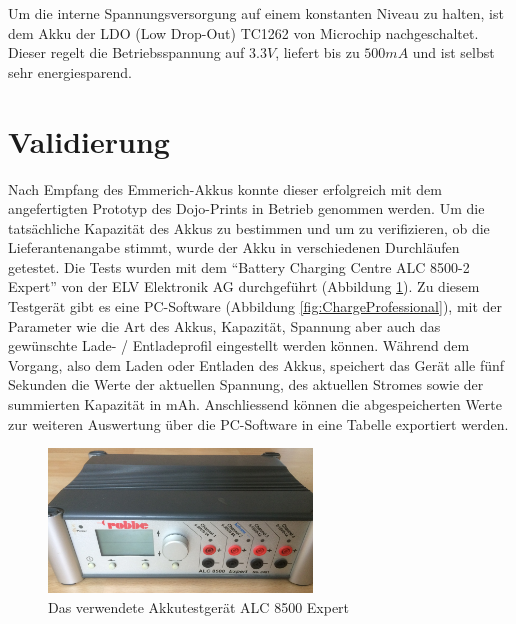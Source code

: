 
Um die interne Spannungsversorgung auf einem konstanten Niveau zu halten, ist dem Akku der LDO (Low Drop-Out) TC1262 von Microchip nachgeschaltet. Dieser regelt die Betriebsspannung auf $3.3V$, liefert bis zu $500mA$ und ist selbst sehr energiesparend.


\section{Validierung}

Nach Empfang des Emmerich-Akkus konnte dieser erfolgreich mit dem angefertigten Prototyp des Dojo-Prints in Betrieb genommen werden. Um die tatsächliche Kapazität des Akkus zu bestimmen und um zu verifizieren, ob die Lieferantenangabe stimmt, wurde der Akku in verschiedenen Durchläufen getestet. Die Tests wurden mit dem ``Battery Charging Centre ALC 8500-2 Expert'' von der ELV Elektronik AG durchgeführt (Abbildung \ref{fig:ALCExpert}). Zu diesem Testgerät gibt es eine PC-Software (Abbildung \ref{fig:ChargeProfessional}), mit der Parameter wie die Art des Akkus, Kapazität, Spannung aber auch das gewünschte Lade- / Entladeprofil eingestellt werden können. Während dem Vorgang, also dem Laden oder Entladen des Akkus, speichert das Gerät alle fünf Sekunden die Werte der aktuellen Spannung, des aktuellen Stromes sowie der summierten Kapazität in mAh. Anschliessend können die abgespeicherten Werte zur weiteren Auswertung über die PC-Software in eine Tabelle exportiert werden.\\

\begin{figure}[htp]
	\centering
	\includegraphics[width=7cm]{Bilder/ALC8500Expert.JPG}
	 \caption{Das verwendete Akkutestgerät ALC 8500 Expert}
	 \label{fig:ALCExpert}
\end{figure}

